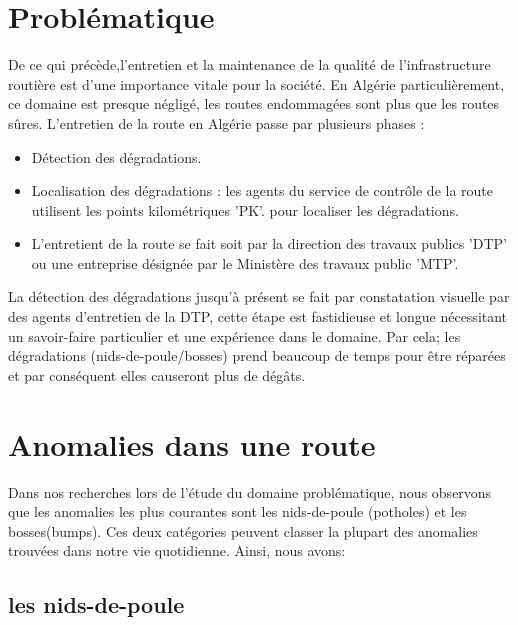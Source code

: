   \section{Problématique}
  De ce qui précède,l’entretien et la maintenance de la qualité de l'infrastructure routière est d'une importance vitale pour la société.\newline
  En Algérie particulièrement, ce domaine est presque négligé, les routes endommagées sont plus que les routes sûres.\newline 
  L’entretien de la route en Algérie  passe par plusieurs phases :
      \renewcommand{\labelitemi}{$\bullet$} 
      \begin{itemize}
          \item Détection des dégradations.
          \item Localisation des dégradations : les agents du service de contrôle de la route utilisent les points kilométriques 'PK'. pour localiser les dégradations.
          \item L’entretient de la route se fait soit par la direction des travaux publics 'DTP' ou une entreprise désignée par le Ministère des travaux public 'MTP'. 
      \end{itemize}
  La détection des dégradations jusqu’à présent se fait par constatation visuelle par des agents d’entretien de la DTP, cette étape est fastidieuse et longue nécessitant un savoir-faire particulier et une expérience dans le domaine. Par cela; les dégradations (nids-de-poule/bosses) prend beaucoup de temps pour être réparées et par conséquent elles causeront plus de dégâts.

  \section{Anomalies dans une route}
Dans nos recherches lors de l'étude du domaine problématique, nous observons que les anomalies
 les plus courantes sont les nids-de-poule (potholes) et les bosses(bumps).
  Ces deux catégories peuvent classer la plupart des anomalies trouvées dans notre vie quotidienne. Ainsi, nous avons:

  \subsection{les nids-de-poule}


